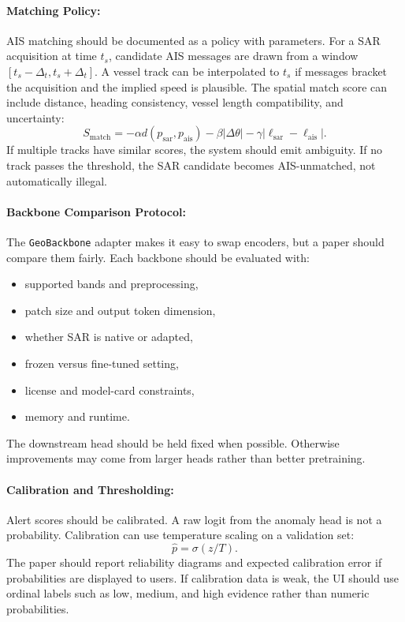 \documentclass{article}
\begin{document}
\paragraph{Matching Policy:}

AIS matching should be documented as a policy with parameters. For a SAR acquisition at time $t_s$, candidate AIS messages are drawn from a window $[t_s-\Delta_t,t_s+\Delta_t]$. A vessel track can be interpolated to $t_s$ if messages bracket the acquisition and the implied speed is plausible. The spatial match score can include distance, heading consistency, vessel length compatibility, and uncertainty:
\begin{equation}
  S_{\text{match}} = -\alpha d(p_{\text{sar}},p_{\text{ais}})-\beta |\Delta \theta|-\gamma |\ell_{\text{sar}}-\ell_{\text{ais}}|.
\end{equation}
If multiple tracks have similar scores, the system should emit ambiguity. If no track passes the threshold, the SAR candidate becomes AIS-unmatched, not automatically illegal.

\paragraph{Backbone Comparison Protocol:}

The \texttt{GeoBackbone} adapter makes it easy to swap encoders, but a paper should compare them fairly. Each backbone should be evaluated with:
\begin{itemize}
  \item supported bands and preprocessing,
  \item patch size and output token dimension,
  \item whether SAR is native or adapted,
  \item frozen versus fine-tuned setting,
  \item license and model-card constraints,
  \item memory and runtime.
\end{itemize}
The downstream head should be held fixed when possible. Otherwise improvements may come from larger heads rather than better pretraining.

\paragraph{Calibration and Thresholding:}

Alert scores should be calibrated. A raw logit from the anomaly head is not a probability. Calibration can use temperature scaling on a validation set:
\begin{equation}
  \hat{p}=\sigma(z/T).
\end{equation}
The paper should report reliability diagrams and expected calibration error if probabilities are displayed to users. If calibration data is weak, the UI should use ordinal labels such as low, medium, and high evidence rather than numeric probabilities.
\end{document}
